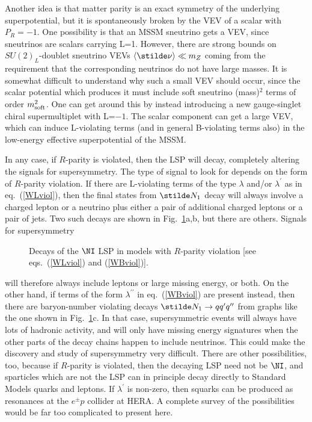 Another idea is that matter parity is an exact symmetry of the underlying
superpotential, but it is spontaneously broken by the VEV of a scalar
with $P_R=-1$. 
One possibility is that an MSSM
sneutrino gets a VEV,\cite{sneutrinovevRparityviolation} since sneutrinos
are scalars carrying L=1. However,
there are strong bounds \cite{nonsneutrinovevRparityviolation} on
$SU(2)_L$-doublet sneutrino
VEVs
$\langle \stilde \nu \rangle \ll m_Z$ coming from the
requirement
that the corresponding
neutrinos do not have large masses. It is somewhat
difficult
to understand why such a small VEV should occur, since the scalar
potential which produces it must include soft sneutrino (mass)$^2$
terms of order $m^2_{\rm soft}$. One can get around this
by instead introducing a new gauge-singlet chiral supermultiplet with
L=$-1$. The scalar component can get a large VEV, which can induce
L-violating terms (and in general B-violating terms also) in the
low-energy effective superpotential of the
MSSM.\cite{nonsneutrinovevRparityviolation}

In any case, if $R$-parity is violated, then the LSP will decay,
completely
altering the signals for supersymmetry. The type of signal
to look for depends on the form of $R$-parity violation.
If there are L-violating
terms of the type $\lambda$ and/or $\lambda^\prime$ as in
eq.~(\ref{WLviol}), then the final states from
$\stilde N_1$ decay will always involve a charged lepton or a neutrino
plus either a pair of additional charged leptons or a pair of jets.
Two such decays are shown in Fig.~\ref{fig:rparityviolation}a,b, but
there are others. Signals for
supersymmetry
\begin{figure}
\centerline{}
\caption{Decays of the $\NI$ LSP in models with $R$-parity violation
[see eqs.~(\ref{WLviol}) and (\ref{WBviol})].
\label{fig:rparityviolation}}
\end{figure}
will therefore always include leptons or large missing energy, or both.
On the other hand,
if terms of the form $\lambda^{\prime\prime}$ in eq.~(\ref{WBviol}) are
present instead, then there are baryon-number violating decays
$\stilde N_1 \rightarrow q q^\prime q^{\prime\prime}$ from
graphs like the
one shown in Fig.~\ref{fig:rparityviolation}c. In
that case, supersymmetric
events will always have lots of hadronic activity, and will only have
missing energy signatures when the other parts of the decay chains
happen to include neutrinos. This could make the discovery
and study
of supersymmetry very difficult.
There are other possibilities, too, because if $R$-parity is violated,
then the decaying LSP need not be $\NI$,
and sparticles which are not the LSP can in principle decay directly
to Standard Models quarks and leptons. If $\lambda^{\prime}$
is non-zero, then squarks can be produced as resonances at
the $e^\pm p$ collider at HERA.
A complete survey of the
possibilities would be far too complicated to present here.

